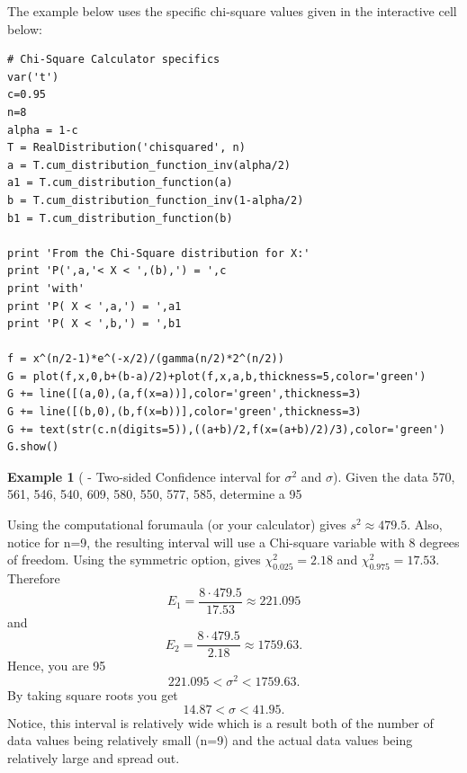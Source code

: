 \documentclass[10pt,]{book}
\theoremstyle{plain}
\theoremstyle{definition}
\theoremstyle{definition}
\newtheorem{example}[theorem]{Example}
\theoremstyle{definition}
\numberwithin{equation}{section}
\newcommand{\lt}{ < }
\begin{document}
The example below uses the specific chi-square values given in the interactive cell below:

\begin{lstlisting}[style=sageinput]
# Chi-Square Calculator specifics
var('t')
c=0.95
n=8
alpha = 1-c
T = RealDistribution('chisquared', n)
a = T.cum_distribution_function_inv(alpha/2)
a1 = T.cum_distribution_function(a)
b = T.cum_distribution_function_inv(1-alpha/2)
b1 = T.cum_distribution_function(b)

print 'From the Chi-Square distribution for X:'
print 'P(',a,'< X < ',(b),') = ',c
print 'with'
print 'P( X < ',a,') = ',a1
print 'P( X < ',b,') = ',b1

f = x^(n/2-1)*e^(-x/2)/(gamma(n/2)*2^(n/2))
G = plot(f,x,0,b+(b-a)/2)+plot(f,x,a,b,thickness=5,color='green')
G += line([(a,0),(a,f(x=a))],color='green',thickness=3)
G += line([(b,0),(b,f(x=b))],color='green',thickness=3)
G += text(str(c.n(digits=5)),((a+b)/2,f(x=(a+b)/2)/3),color='green')
G.show()
\end{lstlisting}



\begin{example}[ - Two-sided Confidence interval for \(\sigma^2\) and \(\sigma\)]\label{example-31}
Given the data 570, 561, 546, 540, 609, 580, 550, 577, 585, determine a 95%
%
\par

Using the computational forumaula (or your calculator) gives \(s^2 \approx 479.5\). Also, notice for n=9, the resulting interval will use a Chi-square variable with 8 degrees of freedom. Using the symmetric option, gives
\(\chi_{0.025}^2 = 2.18\) and \(\chi_{0.975}^2 = 17.53\).  Therefore
\begin{equation*} E_1 = \frac{8 \cdot 479.5}{17.53} \approx 221.095\end{equation*}
and
\begin{equation*} E_2 = \frac{8 \cdot 479.5}{2.18} \approx 1759.63.\end{equation*}
Hence, you are 95%
\begin{equation*}221.095 \lt \sigma^2 \lt 1759.63.\end{equation*}
By taking square roots you get
\begin{equation*}14.87 \lt \sigma \lt 41.95.\end{equation*}
Notice, this interval is relatively wide which is a result both of the number of data values being relatively small (n=9) and the actual data values being relatively large and spread out.
%
\end{example}
\end{document}
